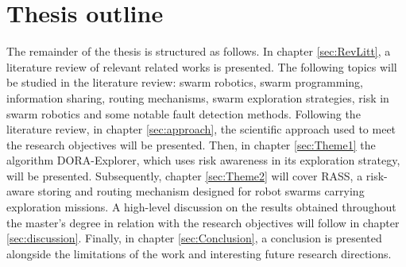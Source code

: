 \section{Thesis outline}
The remainder of the thesis is structured as follows. In chapter \ref{sec:RevLitt}, a literature review of relevant related works is presented. The following topics will be studied in the literature review: swarm robotics, swarm programming, information sharing, routing mechanisms, swarm exploration strategies, risk in swarm robotics and some notable fault detection methods. Following the literature review, in chapter \ref{sec:approach}, the scientific approach used to meet the research objectives will be presented. Then, in chapter \ref{sec:Theme1} the algorithm DORA-Explorer, which uses risk awareness in its exploration strategy, will be presented. Subsequently, chapter \ref{sec:Theme2} will cover RASS, a risk-aware storing and routing mechanism designed for robot swarms carrying exploration missions. A high-level discussion on the results obtained throughout the master's degree in relation with the research objectives will follow in chapter \ref{sec:discussion}. Finally, in chapter \ref{sec:Conclusion}, a conclusion is presented alongside the limitations of the work and interesting future research directions.
